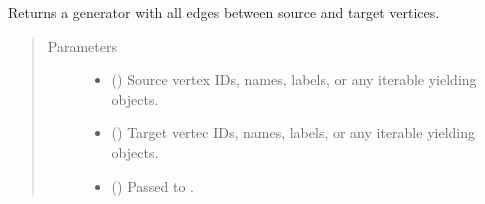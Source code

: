\documentclass[letterpaper,10pt,english]{sphinxmanual}
\begin{document}
\begin{fulllineitems}
\begin{fulllineitems}
\end{fulllineitems}


\begin{fulllineitems}
\label{\detokenize{main:pypath.main.PyPath.get_edges}}
Returns a generator with all edges between source and target vertices.
\begin{quote}\begin{description}
\item[{Parameters}] \leavevmode\begin{itemize}
\item {} 
 () \textendash{} Source vertex IDs, names, labels, or any iterable yielding
 objects.

\item {} 
 () \textendash{} Target vertec IDs, names, labels, or any iterable yielding
 objects.

\item {} 
 () \textendash{} Passed to .

\end{itemize}

\end{description}\end{quote}

\end{fulllineitems}


\begin{fulllineitems}
\label{\detokenize{main:pypath.main.PyPath.get_function}}
\end{fulllineitems}



\end{fulllineitems}
\end{document}
